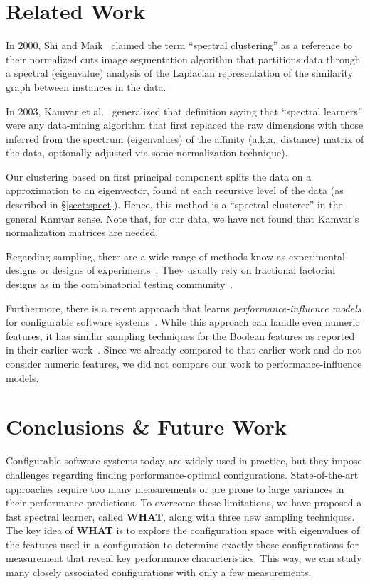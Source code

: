 \documentclass[smallextended]{svjour3}       %
\newcommand{\tion}[1]{\S\ref{sect:#1}}
\newcommand{\what}{{\bf WHAT}\xspace}
\begin{document}
\section{Related Work}
\label{sect:related}
 
In 2000, Shi and Maik~\cite{shi00} claimed the term ``spectral clustering'' as a reference to their normalized cuts
image
segmentation algorithm that  partitions data through a spectral (eigenvalue) analysis of the  
Laplacian representation of the similarity graph between instances in the data.

In 2003, Kamvar et al.~\cite{kamvar2003spectral}  generalized that definition saying that ``spectral learners''
were any data-mining algorithm that first replaced the raw
dimensions with those inferred from the spectrum (eigenvalues) of the affinity (a.k.a.\ distance)
matrix of the data, optionally adjusted via some normalization technique).

Our clustering based on first principal component splits the data on a   approximation to an eigenvector, found at each recursive level
of the data (as described in \tion{spect}). 
Hence, this  method is a ``spectral clusterer'' in the general Kamvar sense. 
Note that,
for our data, we have
not found that Kamvar's normalization matrices are needed.

Regarding sampling, there are a wide range of methods know as experimental designs or designs of experiments~\cite{pukelsheim2006optimal}. They usually rely on fractional factorial designs as in the combinatorial testing community~\cite{Kuhn:2013}. 

Furthermore, there is a recent approach that learns {\em per\-for\-mance-influence models} for configurable software systems~\cite{SGA+15}. While this approach can handle even numeric features, it has similar sampling techniques for the Boolean features as reported in their earlier work~\cite{siegmund2012predicting}. Since we already compared to that earlier work and do not consider numeric features, we did not compare our work to performance-influence models.
 



\section{Conclusions \& Future Work}

Configurable software systems today are widely used in practice, but they impose challenges
regarding finding performance-optimal configurations. State-of-the-art approaches require too
many measurements or are prone to large variances in their performance predictions. To overcome
these limitations, we have proposed a fast spectral learner, called \what,  along with three
new sampling techniques. The key idea of \what is to explore the configuration space with
eigenvalues of the features used in a configuration to determine exactly those configurations
for measurement that reveal key performance characteristics. 
This way, we can study many closely associated configurations with only a few measurements.
\end{document}
